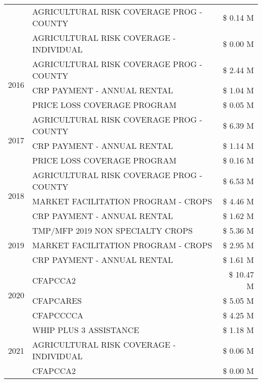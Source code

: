 \begin{tabular}{llr}
 & AGRICULTURAL RISK COVERAGE PROG - COUNTY & \$ 0.14 M \\
 & AGRICULTURAL RISK COVERAGE - INDIVIDUAL & \$ 0.00 M \\
\cline{1-3}
\multirow[t]{3}{*}{2016} & AGRICULTURAL RISK COVERAGE PROG - COUNTY & \$ 2.44 M \\
 & CRP PAYMENT - ANNUAL RENTAL & \$ 1.04 M \\
 & PRICE LOSS COVERAGE PROGRAM & \$ 0.05 M \\
\cline{1-3}
\multirow[t]{3}{*}{2017} & AGRICULTURAL RISK COVERAGE PROG - COUNTY & \$ 6.39 M \\
 & CRP PAYMENT - ANNUAL RENTAL & \$ 1.14 M \\
 & PRICE LOSS COVERAGE PROGRAM & \$ 0.16 M \\
\cline{1-3}
\multirow[t]{3}{*}{2018} & AGRICULTURAL RISK COVERAGE PROG - COUNTY & \$ 6.53 M \\
 & MARKET FACILITATION PROGRAM - CROPS & \$ 4.46 M \\
 & CRP PAYMENT - ANNUAL RENTAL & \$ 1.62 M \\
\cline{1-3}
\multirow[t]{3}{*}{2019} & TMP/MFP 2019 NON SPECIALTY CROPS & \$ 5.36 M \\
 & MARKET FACILITATION PROGRAM - CROPS & \$ 2.95 M \\
 & CRP PAYMENT - ANNUAL RENTAL & \$ 1.61 M \\
\cline{1-3}
\multirow[t]{3}{*}{2020} & CFAPCCA2 & \$ 10.47 M \\
 & CFAPCARES & \$ 5.05 M \\
 & CFAPCCCCA & \$ 4.25 M \\
\cline{1-3}
\multirow[t]{3}{*}{2021} & WHIP PLUS 3 ASSISTANCE & \$ 1.18 M \\
 & AGRICULTURAL RISK COVERAGE - INDIVIDUAL & \$ 0.06 M \\
 & CFAPCCA2 & \$ 0.00 M \\
\cline{1-3}
\bottomrule
\end{tabular}
